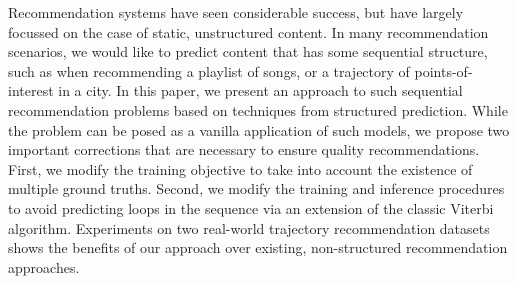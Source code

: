 Recommendation systems have seen considerable success, but have largely focussed on the case of static, unstructured content.
In many recommendation scenarios, we would like to predict content that has some sequential structure,
such as when recommending a playlist of songs, or a trajectory of points-of-interest in a city.
In this paper, we present an approach to such sequential recommendation problems based on techniques from structured prediction.
While the problem can be posed as a vanilla application of such models,
we propose two important corrections that are necessary to ensure quality recommendations.
First, we modify the training objective to take into account the existence of multiple ground truths.
Second, we modify the training and inference procedures to avoid predicting loops in the sequence via an extension of the classic Viterbi algorithm.
Experiments on two real-world trajectory recommendation datasets shows the benefits of our approach over existing, non-structured recommendation approaches.

